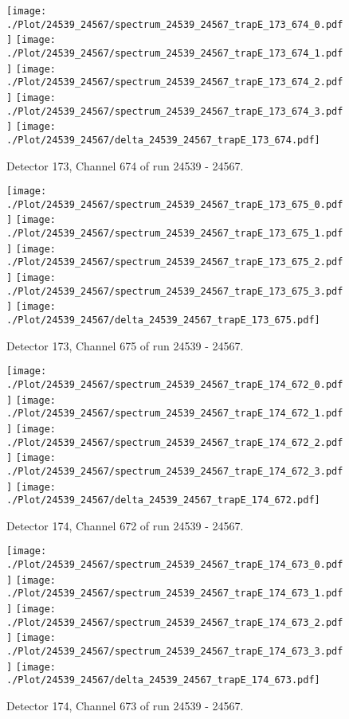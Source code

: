 \clearpage
\begin{figure}[hb]
\centering
\texttt{[image: ./Plot/24539\_24567/spectrum\_24539\_24567\_trapE\_173\_674\_0.pdf]}
\texttt{[image: ./Plot/24539\_24567/spectrum\_24539\_24567\_trapE\_173\_674\_1.pdf]}
\texttt{[image: ./Plot/24539\_24567/spectrum\_24539\_24567\_trapE\_173\_674\_2.pdf]}
\texttt{[image: ./Plot/24539\_24567/spectrum\_24539\_24567\_trapE\_173\_674\_3.pdf]}
\texttt{[image: ./Plot/24539\_24567/delta\_24539\_24567\_trapE\_173\_674.pdf]}
\caption{ Detector 173, Channel 674 of run 24539 - 24567.}
\label{fig:24539_24567_trapE_173_674}
\end{figure}
\clearpage
\begin{figure}[hb]
\centering
\texttt{[image: ./Plot/24539\_24567/spectrum\_24539\_24567\_trapE\_173\_675\_0.pdf]}
\texttt{[image: ./Plot/24539\_24567/spectrum\_24539\_24567\_trapE\_173\_675\_1.pdf]}
\texttt{[image: ./Plot/24539\_24567/spectrum\_24539\_24567\_trapE\_173\_675\_2.pdf]}
\texttt{[image: ./Plot/24539\_24567/spectrum\_24539\_24567\_trapE\_173\_675\_3.pdf]}
\texttt{[image: ./Plot/24539\_24567/delta\_24539\_24567\_trapE\_173\_675.pdf]}
\caption{ Detector 173, Channel 675 of run 24539 - 24567.}
\label{fig:24539_24567_trapE_173_675}
\end{figure}
\clearpage
\begin{figure}[hb]
\centering
\texttt{[image: ./Plot/24539\_24567/spectrum\_24539\_24567\_trapE\_174\_672\_0.pdf]}
\texttt{[image: ./Plot/24539\_24567/spectrum\_24539\_24567\_trapE\_174\_672\_1.pdf]}
\texttt{[image: ./Plot/24539\_24567/spectrum\_24539\_24567\_trapE\_174\_672\_2.pdf]}
\texttt{[image: ./Plot/24539\_24567/spectrum\_24539\_24567\_trapE\_174\_672\_3.pdf]}
\texttt{[image: ./Plot/24539\_24567/delta\_24539\_24567\_trapE\_174\_672.pdf]}
\caption{ Detector 174, Channel 672 of run 24539 - 24567.}
\label{fig:24539_24567_trapE_174_672}
\end{figure}
\clearpage
\begin{figure}[hb]
\centering
\texttt{[image: ./Plot/24539\_24567/spectrum\_24539\_24567\_trapE\_174\_673\_0.pdf]}
\texttt{[image: ./Plot/24539\_24567/spectrum\_24539\_24567\_trapE\_174\_673\_1.pdf]}
\texttt{[image: ./Plot/24539\_24567/spectrum\_24539\_24567\_trapE\_174\_673\_2.pdf]}
\texttt{[image: ./Plot/24539\_24567/spectrum\_24539\_24567\_trapE\_174\_673\_3.pdf]}
\texttt{[image: ./Plot/24539\_24567/delta\_24539\_24567\_trapE\_174\_673.pdf]}
\caption{ Detector 174, Channel 673 of run 24539 - 24567.}
\label{fig:24539_24567_trapE_174_673}
\end{figure}
